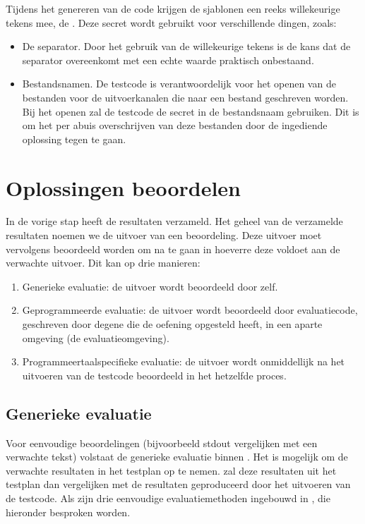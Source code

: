 Tijdens het genereren van de code krijgen de sjablonen een reeks willekeurige tekens mee, de .
Deze secret wordt gebruikt voor verschillende dingen, zoals:
\begin{itemize}
    \item De separator.
    Door het gebruik van de willekeurige tekens is de kans dat de separator overeenkomt met een echte waarde praktisch onbestaand.
    \item Bestandsnamen.
    De testcode is verantwoordelijk voor het openen van de bestanden voor de uitvoerkanalen die naar een bestand geschreven worden.
    Bij het openen zal de testcode de secret in de bestandsnaam gebruiken.
    Dit is om het per abuis overschrijven van deze bestanden door de ingediende oplossing tegen te gaan.
\end{itemize}

\section{Oplossingen beoordelen}\label{sec:oplossingen-beoordelen}

In de vorige stap heeft \tested{} de resultaten verzameld.
Het geheel van de verzamelde resultaten noemen we de uitvoer van een beoordeling.
Deze uitvoer moet vervolgens beoordeeld worden om na te gaan in hoeverre deze voldoet aan de verwachte uitvoer.
Dit kan op drie manieren:
\begin{enumerate}
    \item Generieke evaluatie: de uitvoer wordt beoordeeld door \tested{} zelf.
    \item Geprogrammeerde evaluatie: de uitvoer wordt beoordeeld door evaluatiecode, geschreven door degene die de oefening opgesteld heeft, in een aparte omgeving (de evaluatieomgeving).
    \item Programmeertaalspecifieke evaluatie: de uitvoer wordt onmiddellijk na het uitvoeren van de testcode beoordeeld in het hetzelfde proces.
\end{enumerate}

\subsection{Generieke evaluatie}\label{subsec:ingebouwde-evaluator}

Voor eenvoudige beoordelingen (bijvoorbeeld stdout vergelijken met een verwachte tekst) volstaat de generieke evaluatie binnen \tested{}.
Het is mogelijk om de verwachte resultaten in het testplan op te nemen.
\tested{} zal deze resultaten uit het testplan dan vergelijken met de resultaten geproduceerd door het uitvoeren van de testcode.
Als  zijn drie eenvoudige evaluatiemethoden ingebouwd in \tested{}, die hieronder besproken worden.

